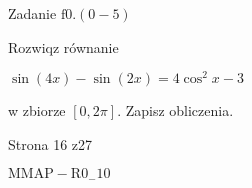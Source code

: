 \documentclass[a4paper,12pt]{article}
\begin{document}
Zadanie $\mathrm{f}0. (0-5)$

Rozwiqz równanie

$\sin(4x)-\sin(2x)=4\cos^{2}x-3$

w zbiorze $[0,2\pi]$. Zapisz obliczenia.

Strona 16 z27

$\mathrm{M}\mathrm{M}\mathrm{A}\mathrm{P}-\mathrm{R}0_{-}10$
\end{document}

